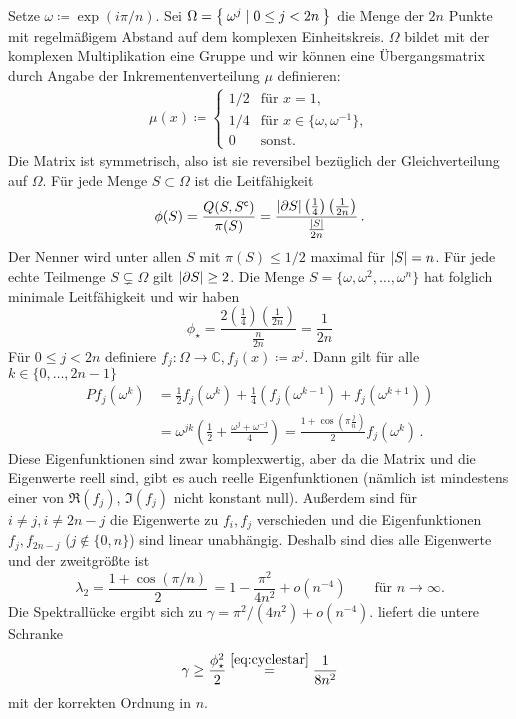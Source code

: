 \documentclass[ngerman,a4paper,11pt]{scrartcl}
\newcommand{\stcomp}[1]{{#1}^{\mathsf{c}}} %
\newcommand{\CC}{\mathbb{C}}
\DeclarePairedDelimiter{\abs}{\lvert}{\rvert}		%
\begin{document}
\begin{exmpbk}[Träge Irrfahrt auf dem $2n$\=/Zykel]
 Setze $\omega\coloneqq\exp(i\pi/n)$.
 Sei $\Omega=\Set{\omega^j\mid 0\leq j<2n}$ die Menge der $2n$ Punkte mit
 regelmäßigem Abstand auf dem komplexen Einheitskreis. $\Omega$ bildet mit der
 komplexen Multiplikation eine Gruppe und wir können eine Übergangsmatrix durch
 Angabe der Inkrementenverteilung $\mu$ definieren: 
 \begin{align*}
  \mu(x)\coloneqq
  \begin{cases}
   1/2&\text{für }x=1, \\
   1/4&\text{für }x\in\{\omega,\omega^{-1}\}, \\
   0&\text{sonst.}
  \end{cases}
 \end{align*}
 Die Matrix ist symmetrisch, also ist sie reversibel bezüglich der
 Gleichverteilung auf $\Omega$.
 Für jede Menge $S\subset\Omega$ ist die Leitfähigkeit
 \begin{equation*}
  \phi(S)=\frac{Q(S,\stcomp{S})}{\pi(S)}=\frac{\abs{\partial S}\left( \frac{1}{4} \right)\left( \frac{1}{2n} \right)}{\frac{\abs{S}}{2n}} \, .
 \end{equation*}
 Der Nenner wird unter allen $S$ mit $\pi(S)\leq 1/2$ maximal für $\abs{S}=n$.
 Für jede echte Teilmenge $S\subsetneq\Omega$ gilt $\abs{\partial S}\geq 2$.
 Die Menge $S=\{\omega,\omega^2,\dotsc,\omega^n\}$ hat folglich minimale
 Leitfähigkeit und wir haben
 \begin{equation}
  \label{eq:cyclestar}
  \phi_\star=\frac{2\left( \frac{1}{4} \right)\left( \frac{1}{2n} \right)}{\frac{n}{2n}}=\frac{1}{2n} 
 \end{equation}
 Für $0\leq j<2n$ definiere $f_j:\Omega\to\CC, f_j(x)\coloneqq x^j$.
 Dann gilt für alle $k\in\{0,\dotsc,2n-1\}$
 \begin{align*}
  Pf_j(\omega^k)&=\frac{1}{2}f_j(\omega^k)+\frac{1}{4}\left( f_j(\omega^{k-1})+f_j(\omega^{k+1}) \right) \\
  &=\omega^{jk}\left(\frac{1}{2} + \frac{\omega^j+\omega^{-j}}{4} \right)=\frac{1+\cos(\pi\frac{j}{n})}{2}f_j(\omega^k) \, .
 \end{align*}
 Diese Eigenfunktionen sind zwar komplexwertig, aber da die Matrix und die
 Eigenwerte reell sind, gibt es auch reelle Eigenfunktionen (nämlich ist
 mindestens einer von $\Re(f_j)$, $\Im(f_j)$ nicht konstant null). Außerdem sind
 für $i\neq j, i\neq 2n-j$ die Eigenwerte zu $f_i,f_j$ verschieden und die
 Eigenfunktionen $f_j,f_{2n-j}$ ($j\notin\{0,n\}$) sind linear unabhängig.
 Deshalb sind dies alle Eigenwerte und der zweitgrößte ist 
 \begin{equation*}
  \lambda_2=\frac{1+\cos(\pi/n)}{2}\, =1-\frac{\pi^2}{4n^2}+o(n^{-4})\qquad\text{für $n\to\infty$.}
 \end{equation*}
 Die Spektrallücke ergibt sich zu $\gamma=\pi^2/(4n^2)+o(n^{-4})$.
  liefert die untere Schranke
 \begin{equation*}
  \gamma\geq\frac{\phi_\star^2}{2}\overset{\eqref{eq:cyclestar}}{=}\frac{1}{8n^2} 
 \end{equation*}
 mit der korrekten Ordnung in $n$.
\end{exmpbk}
\end{document}
